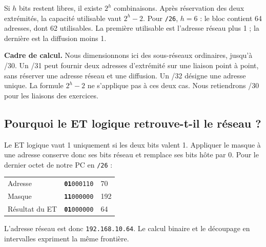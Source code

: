 \documentclass[11pt,a4paper]{article}
\newcommand{\ip}[1]{\textcolor{ipred}{\texttt{#1}}}
\newcommand{\R}[1]{\textcolor{bitres}{\textbf{#1}}}   %
\newcommand{\Hb}[1]{\textcolor{bithote}{#1}}          %
\begin{document}
\begin{center}
\end{center}

Si $h$ bits restent libres, il existe $2^h$ combinaisons. Après réservation des deux extrémités,
la capacité utilisable vaut $2^h-2$. Pour \ip{/26}, $h=6$ : le bloc contient 64 adresses, dont 62 utilisables.
La première utilisable est l'adresse réseau plus 1 ; la dernière est la diffusion moins 1.

\begin{piege}
\textbf{Cadre de calcul.} Nous dimensionnons ici des sous-réseaux ordinaires, jusqu'à /30.
Un /31 peut fournir deux adresses d'extrémité sur une liaison point à point, sans réserver une
adresse réseau et une diffusion. Un /32 désigne une adresse unique.
La formule $2^h-2$ ne s'applique pas à ces deux cas. Nous retiendrons /30 pour les liaisons des exercices.
\end{piege}

\Needspace{4cm}
\subsection*{Pourquoi le ET logique retrouve-t-il le réseau ?}
Le ET logique vaut 1 uniquement si les deux bits valent 1. Appliquer le masque à une adresse
conserve donc ses bits réseau et remplace ses bits hôte par 0.
Pour le dernier octet de notre PC en \ip{/26} :
\begin{center}
\begin{tabular}{@{}lll@{}}
Adresse & \texttt{\R{01}\Hb{000110}} & 70\\
Masque & \texttt{\R{11}\Hb{000000}} & 192\\
\midrule
Résultat du ET & \texttt{\R{01}\Hb{000000}} & 64\\
\end{tabular}
\end{center}
L'adresse réseau est donc \ip{192.168.10.64}. Le calcul binaire et le découpage en intervalles
expriment la même frontière.
\end{document}
